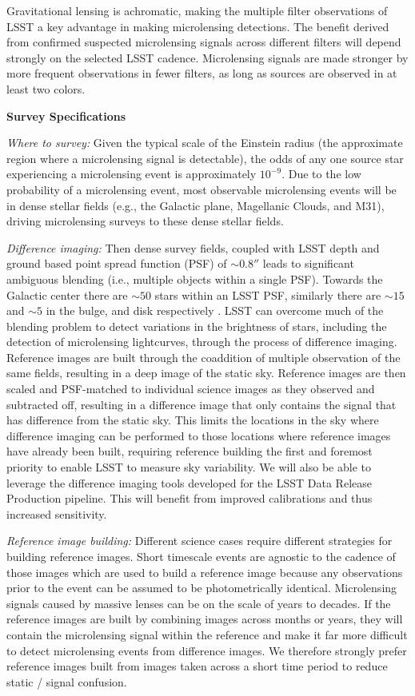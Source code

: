 Gravitational lensing is achromatic, making the multiple filter observations of LSST a key advantage in making microlensing detections.
The benefit derived from confirmed suspected microlensing signals across different filters will depend strongly on the selected LSST cadence. 
Microlensing signals are made stronger by more frequent observations in fewer filters, as long as sources are observed in at least two colors. 

\noindent \textbf{Survey Specifications}

\emph{Where to survey:} Given the typical scale  of the Einstein radius (the approximate region where a microlensing signal is detectable), the odds of any one source star experiencing a microlensing event is approximately $10^{-9}$. Due to the low probability of a microlensing event, most observable microlensing events will be in dense stellar fields (e.g., the Galactic plane, Magellanic Clouds, and M31), driving microlensing surveys to these dense stellar fields.

\emph{Difference imaging:} Then dense survey fields, coupled with LSST depth and ground based point spread function (PSF) of $\sim0.8''$ leads to significant ambiguous blending (i.e., multiple objects within a single PSF).
Towards the Galactic center there are $\sim50$ stars within an LSST PSF, similarly there are $\sim15$ and $\sim5$ in the bulge, and disk respectively \cite{arXiv:1806.06372}.
LSST can overcome much of the blending problem to detect variations in the brightness of stars, including the detection of microlensing lightcurves, through the process of difference imaging.
Reference images are built through the coaddition of multiple observation of the same fields, resulting in a deep image of the static sky. Reference images are then scaled and PSF-matched to individual science images as they observed and subtracted off, resulting in a difference image that only contains the signal that has difference from the static sky. This limits the locations in the sky where difference imaging can be performed to those locations where reference images have already been built, requiring reference building the first and foremost priority to enable LSST to measure sky variability.  We will also be able to leverage the difference imaging tools developed for the LSST Data Release Production pipeline.  This will benefit from improved calibrations and thus increased sensitivity.

\emph{Reference image building:} Different science cases require different strategies for building reference images. Short timescale events are agnostic to the cadence of those images which are used to build a reference image because any observations prior to the event can be assumed to be photometrically identical. Microlensing signals caused by massive lenses can be on the scale of years to decades. If the reference images are built by combining images across months or years, they will contain the microlensing signal within the reference and make it far more difficult to detect microlensing events from difference images. We therefore strongly prefer reference images built from images taken across a short time period to reduce static / signal confusion.

